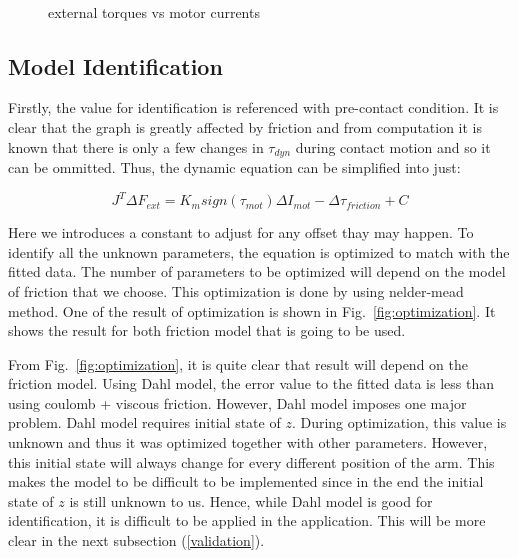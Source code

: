 \documentclass[letterpaper, 10 pt, conference]{ieeeconf}
\newcommand{\fref}[1]{Fig.~\ref{#1}}
\begin{document}
\begin{figure}[t]
   \,
   \,
  \caption{ external torques vs motor currents}
  \label{fig:prelim result}
\end{figure}

\subsection{Model Identification}
\label{identification}

Firstly, the value for identification is referenced with pre-contact condition. It is clear that the graph is greatly affected by friction and from computation it is known that there is only a few changes in $\tau_{dyn}$ during contact motion and so it can be ommitted. Thus, the dynamic equation can be simplified into just:

\begin{equation}
  J^{T} \Delta F_{ext} = K_{m} sign\left(\tau_{mot}\right) \Delta I_{mot} - \Delta \tau_{friction} + C
\end{equation}
 
Here we introduces a constant to adjust for any offset thay may happen. To identify all the unknown parameters, the equation is optimized to match with the fitted data. The number of parameters to be optimized will depend on the model of friction that we choose. This optimization is done by using nelder-mead method. One of the result of optimization is shown in \fref{fig:optimization}. It shows the result for both friction model that is going to be used. 

From \fref{fig:optimization}, it is quite clear that result will depend on the friction model. Using Dahl model, the error value to the fitted data is less than using coulomb + viscous friction. However, Dahl model imposes one major problem. Dahl model requires initial state of $z$. During optimization, this value is unknown and thus it was optimized together with other parameters. However, this initial state will always change for every different position of the arm. This makes the model to be difficult to be implemented since in the end the initial state of $z$ is still unknown to us. Hence, while Dahl model is good for identification, it is difficult to be applied in the application. This will be more clear in the next subsection (\ref{validation}).
\end{document}

